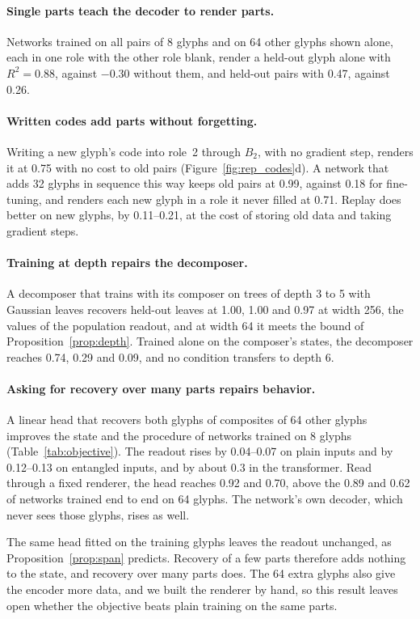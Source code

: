 \documentclass[10pt]{article}
\theoremstyle{plain}
\theoremstyle{remark}
\begin{document}
\paragraph{Single parts teach the decoder to render parts.} Networks trained on all pairs of 8 glyphs and on 64 other glyphs shown alone, each in one role with the other role blank, render a held-out glyph alone with $R^2 = 0.88$, against $-0.30$ without them, and held-out pairs with 0.47, against 0.26.

\paragraph{Written codes add parts without forgetting.} Writing a new glyph's code into role~2 through $B_2$, with no gradient step, renders it at 0.75 with no cost to old pairs (Figure~\ref{fig:rep_codes}d). A network that adds 32 glyphs in sequence this way keeps old pairs at 0.99, against 0.18 for fine-tuning, and renders each new glyph in a role it never filled at 0.71. Replay does better on new glyphs, by 0.11--0.21, at the cost of storing old data and taking gradient steps.

\paragraph{Training at depth repairs the decomposer.} A decomposer that trains with its composer on trees of depth 3 to 5 with Gaussian leaves recovers held-out leaves at 1.00, 1.00 and 0.97 at width 256, the values of the population readout, and at width 64 it meets the bound of Proposition~\ref{prop:depth}. Trained alone on the composer's states, the decomposer reaches 0.74, 0.29 and 0.09, and no condition transfers to depth 6.

\paragraph{Asking for recovery over many parts repairs behavior.} A linear head that recovers both glyphs of composites of 64 other glyphs improves the state and the procedure of networks trained on 8 glyphs (Table~\ref{tab:objective}). The readout rises by 0.04--0.07 on plain inputs and by 0.12--0.13 on entangled inputs, and by about 0.3 in the transformer. Read through a fixed renderer, the head reaches 0.92 and 0.70, above the 0.89 and 0.62 of networks trained end to end on 64 glyphs. The network's own decoder, which never sees those glyphs, rises as well.

The same head fitted on the training glyphs leaves the readout unchanged, as Proposition~\ref{prop:span} predicts. Recovery of a few parts therefore adds nothing to the state, and recovery over many parts does. The 64 extra glyphs also give the encoder more data, and we built the renderer by hand, so this result leaves open whether the objective beats plain training on the same parts.
\end{document}

